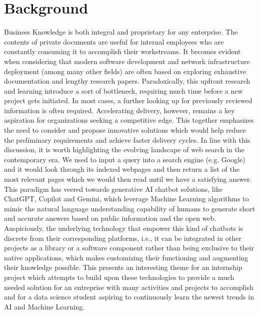 \section{Background}
Business Knowledge is both integral and proprietary for any enterprise. The contents of private documents are useful for internal employees who are constantly consuming it to accomplish their workstreams. It becomes evident when considering that modern software development and network infrastructure deployment (among many other fields) are often based on exploring exhaustive documentation and lengthy research papers. Paradoxically, this upfront research and learning introduce a sort of bottleneck, requiring much time before a new project gets initiated. In most cases, a further looking up for previously reviewed information is often required. Accelerating delivery, however, remains a key aspiration for organizations seeking a competitive edge. This together emphasizes the need to consider and propose innovative solutions which would help reduce the preliminary requirements and achieve faster delivery cycles.\medskip\newline
In line with this discussion, it is worth highlighting the evolving landscape of web search in the contemporary era. We used to input a query into a search engine (e.g. Google) and it would look through its indexed webpages and then return a list of the most relevant pages which we would then read until we have a satisfying answer. This paradigm has veered towards generative AI chatbot solutions, like ChatGPT, Copilot and Gemini, which leverage Machine Learning algorithms to mimic the natural language understanding capability of humans to generate short and accurate answers based on public information and the open web.\smallskip\newline
Auspiciously, the underlying technology that empower this kind of chatbots is discrete from their corresponding platforms, i.e., it can be integrated in other projects as a library or a software component rather than being exclusive to their native applications, which makes customizing their functioning and augmenting their knowledge possible. This presents an interesting theme for an internship project which attempts to build upon these technologies to provide a much needed solution for an entreprise with many activities and projects to accomplish and for a data science student aspiring to continuously learn the newest trends in AI and Machine Learning.

